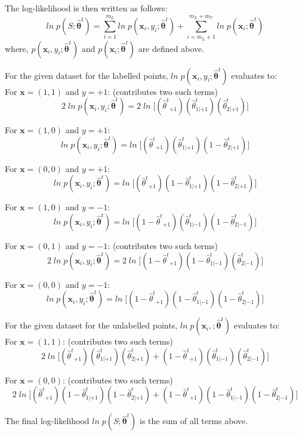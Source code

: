 \documentclass[english]{article}
\begin{document}
\begin{enumerate}
The log-likelihood is then written as follows:
$$ln \; p(S;\bm{\hat{\theta}}^t) = \sum_{i=1}^{m_L} ln \; p(\mathbf{x}_i,y_i;\bm{\hat{\theta}}^t) + \sum_{i = m_L + 1}^{m_L + m_U} ln \; p(\mathbf{x}_i;\bm{\hat{\theta}}^t) $$
where, $p(\mathbf{x}_i,y_i;\bm{\hat{\theta}}^t)$ and $p(\mathbf{x}_i;\bm{\hat{\theta}}^t)$ are defined above. 

For the given dataset for the labelled points, $ln \; p(\mathbf{x}_i,y_i;\bm{\hat{\theta}}^t)$ evaluates to: \\

For $\mathbf{x} = (1,1)$ and $y = +1$: (contributes two such terms)
$$2 \; ln \; p(\mathbf{x}_i,y_i;\bm{\hat{\theta}}^t) = 2 \; ln \; \bigg[ ({\hat{\theta}^t}_{+1}) ({\hat{\theta}_{1|+1}^t}) ({\hat{\theta}_{2|+1}^t}) \bigg]$$

For $\mathbf{x} = (1,0)$ and $y = +1$:
$$ln \; p(\mathbf{x}_i,y_i;\bm{\hat{\theta}}^t) = ln \; \bigg[ ({\hat{\theta}^t}_{+1}) ({\hat{\theta}_{1|+1}^t}) ({1-\hat{\theta}_{2|+1}^t}) \bigg]$$

For $\mathbf{x} = (0,0)$ and $y = +1$:
$$ln \; p(\mathbf{x}_i,y_i;\bm{\hat{\theta}}^t) = ln \; \bigg[ ({\hat{\theta}^t}_{+1}) ({1-\hat{\theta}_{1|+1}^t}) ({1-\hat{\theta}_{2|+1}^t}) \bigg]$$

For $\mathbf{x} = (1,0)$ and $y = -1$:
$$ln \; p(\mathbf{x}_i,y_i;\bm{\hat{\theta}}^t) = ln \; \bigg[(1-{\hat{\theta}^t}_{+1}) ({\hat{\theta}_{1|-1}^t}) ({1-\hat{\theta}_{2|-1}^t})\bigg]$$

For $\mathbf{x} = (0,1)$ and $y = -1$: (contributes two such terms)
$$2 \; ln \; p(\mathbf{x}_i,y_i;\bm{\hat{\theta}}^t) = 2 \; ln \; \bigg[(1-{\hat{\theta}^t}_{+1}) (1-{\hat{\theta}_{1|-1}^t}) ({\hat{\theta}_{2|-1}^t})\bigg]$$

For $\mathbf{x} = (0,0)$ and $y = -1$:
$$ln \; p(\mathbf{x}_i,y_i;\bm{\hat{\theta}}^t) = ln \; \bigg[(1-{\hat{\theta}^t}_{+1}) (1-{\hat{\theta}_{1|-1}^t}) (1-{\hat{\theta}_{2|-1}^t})\bigg]$$

For the given dataset for the unlabelled points, $ln \; p(\mathbf{x}_i,;\bm{\hat{\theta}}^t)$ evaluates to: \\

For $\mathbf{x} = (1,1)$: (contributes two such terms)
$$2 \; ln \; \bigg[({\hat{\theta}^t}_{+1}) ({\hat{\theta}_{1|+1}^t}) ({\hat{\theta}_{2|+1}^t}) + (1-{\hat{\theta}^t}_{+1}) ({\hat{\theta}_{1|-1}^t}) ({\hat{\theta}_{2|-1}^t})\bigg]$$

For $\mathbf{x} = (0,0)$: (contributes two such terms)
$$2 \; ln \; \bigg[({\hat{\theta}^t}_{+1}) (1-{\hat{\theta}_{1|+1}^t}) (1-{\hat{\theta}_{2|+1}^t}) + (1-{\hat{\theta}^t}_{+1}) (1-{\hat{\theta}_{1|-1}^t}) (1-{\hat{\theta}_{2|-1}^t})\bigg]$$

The final log-likelihood $ln \; p(S;\bm{\hat{\theta}}^t)$ is the sum of all terms above. 

\end{enumerate}
\end{document}
